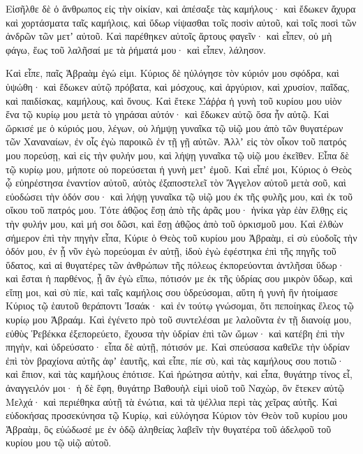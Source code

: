 {Εἰσῆλθε δὲ ὁ ἄνθρωπος εἰς τὴν οἰκίαν, καὶ ἀπέσαξε τὰς καμήλους· καὶ ἔδωκεν ἄχυρα καὶ χορτάσματα ταῖς καμήλοις, καὶ ὕδωρ νίψασθαι τοῖς ποσὶν αὐτοῦ, καὶ τοῖς ποσὶ τῶν ἀνδρῶν τῶν μετʼ αὐτοῦ.
Καὶ παρέθηκεν αὐτοῖς ἄρτους φαγεῖν· καὶ εἶπεν, οὐ μὴ φάγω, ἕως τοῦ λαλῆσαί με τὰ ῥήματά μου· καὶ εἶπεν, λάλησον.
\par }{\PP {}Καὶ εἶπε, παῖς Ἁβραὰμ ἐγώ εἰμι.
Κύριος δὲ ηὐλόγησε τὸν κύριόν μου σφόδρα, καὶ ὑψώθη· καὶ ἔδωκεν αὐτῷ πρόβατα, καὶ μόσχους, καὶ ἀργύριον, καὶ χρυσίον, παῖδας, καὶ παιδίσκας, καμήλους, καὶ ὄνους.
Καὶ ἔτεκε Σάῤῥα ἡ γυνὴ τοῦ κυρίου μου υἱὸν ἕνα τῷ κυρίῳ μου μετὰ τὸ γηράσαι αὐτόν· καὶ ἔδωκεν αὐτῷ ὅσα ἦν αὐτῷ.
Καὶ ὥρκισέ με ὁ κύριός μου, λέγων, οὐ λήμψῃ γυναῖκα τῷ υἱῷ μου ἀπὸ τῶν θυγατέρων τῶν Χαναναίων, ἐν οἷς ἐγὼ παροικῶ ἐν τῇ γῇ αὐτῶν.
Ἀλλʼ εἰς τὸν οἶκον τοῦ πατρός μου πορεύσῃ, καὶ εἰς τὴν φυλήν μου, καὶ λήψῃ γυναῖκα τῷ υἱῷ μου ἐκεῖθεν.
Εἶπα δὲ τῷ κυρίῳ μου, μήποτε οὐ πορεύσεται ἡ γυνὴ μετʼ ἐμοῦ.
Καὶ εἶπέ μοι, Κύριος ὁ Θεὸς ᾧ εὐηρέστησα ἐναντίον αὐτοῦ, αὐτὸς ἐξαποστελεῖ τὸν Ἄγγελον αὐτοῦ μετὰ σοῦ, καὶ εὐοδώσει τὴν ὁδόν σου· καὶ λήψῃ γυναῖκα τῷ υἱῷ μου ἐκ τῆς φυλῆς μου, καὶ ἐκ τοῦ οἴκου τοῦ πατρός μου.
Τότε ἀθῷος ἔσῃ ἀπὸ τῆς ἀρᾶς μου· ἡνίκα γὰρ ἐὰν ἔλθῃς εἰς τὴν φυλήν μου, καὶ μή σοι δῶσι, καὶ ἔσῃ ἀθῷος ἀπὸ τοῦ ὁρκισμοῦ μου.
Καὶ ἐλθὼν σήμερον ἐπὶ τὴν πηγὴν εἶπα, Κύριε ὁ Θεὸς τοῦ κυρίου μου Ἁβραὰμ, εἰ σὺ εὐοδοῖς τὴν ὁδόν μου, ἐν ᾗ νῦν ἐγὼ πορεύομαι ἐν αὐτῇ,
ἰδοὺ ἐγὼ ἐφέστηκα ἐπὶ τῆς πηγῆς τοῦ ὕδατος, καὶ αἱ θυγατέρες τῶν ἀνθρώπων τῆς πόλεως ἐκπορεύονται ἀντλῆσαι ὕδωρ· καὶ ἔσται ἡ παρθένος, ᾗ ἂν ἐγὼ εἴπω, πότισόν με ἐκ τῆς ὑδρίας σου μικρὸν ὕδωρ,
καὶ εἴπῃ μοι, καὶ σὺ πίε, καὶ ταῖς καμήλοις σου ὑδρεύσομαι, αὕτη ἡ γυνὴ ἣν ἡτοίμασε Κύριος τῷ ἑαυτοῦ θεράποντι Ἰσαάκ· καὶ ἐν τούτῳ γνώσομαι, ὅτι πεποίηκας ἔλεος τῷ κυρίῳ μου Ἁβραάμ.
Καὶ ἐγένετο πρὸ τοῦ συντελέσαι με λαλοῦντα ἐν τῇ διανοίᾳ μου, εὐθὺς Ῥεβέκκα ἐξεπορεύετο, ἔχουσα τὴν ὑδρίαν ἐπὶ τῶν ὤμων· καὶ κατέβη ἐπὶ τὴν πηγὴν, καὶ ὑδρεύσατο· εἶπα δὲ αὐτῇ, πότισόν με.
Καὶ σπεύσασα καθεῖλε τὴν ὑδρίαν ἐπὶ τὸν βραχίονα αὐτῆς ἀφʼ ἑαυτῆς, καὶ εἶπε, πίε σὺ, καὶ τὰς καμήλους σου ποτιῶ· καὶ ἔπιον, καὶ τὰς καμήλους ἐπότισε.
Καὶ ἠρώτησα αὐτὴν, καὶ εἶπα, θυγάτηρ τίνος εἶ, ἀναγγειλόν μοι· ἡ δὲ ἔφη, θυγάτηρ Βαθουὴλ εἰμὶ υἱοῦ τοῦ Ναχὼρ, ὃν ἔτεκεν αὐτῷ Μελχά· καὶ περιέθηκα αὐτῇ τὰ ἐνώτια, καὶ τὰ ψέλλια περὶ τὰς χεῖρας αὐτῆς.
Καὶ εὐδοκήσας προσεκύνησα τῷ Κυρίῳ, καὶ εὐλόγησα Κύριον τὸν Θεὸν τοῦ κυρίου μου Ἁβραὰμ, ὃς εὐώδωσέ με ἐν ὁδῷ ἀληθείας λαβεῖν τὴν θυγατέρα τοῦ ἀδελφοῦ τοῦ κυρίου μου τῷ υἱῷ αὐτοῦ.
}
